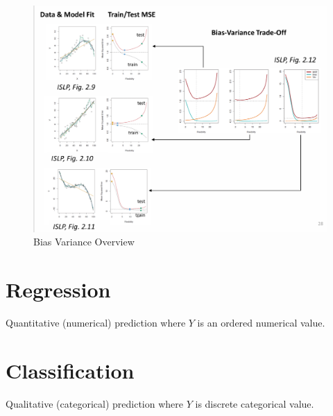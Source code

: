 \documentclass[../Main.tex]{subfiles}
\begin{document}
\begin{figure}[H]
    \centering
    \includegraphics[width=1\linewidth]{Images/bias-variance-tradeoff-overview.png}
    \caption{Bias Variance Overview}
\end{figure}

\newpage
\section{Regression}
Quantitative (numerical) prediction where \(Y\) is an ordered numerical value. 

\section{Classification}
Qualitative (categorical) prediction where \(Y\) is discrete categorical value. 
\end{document}
